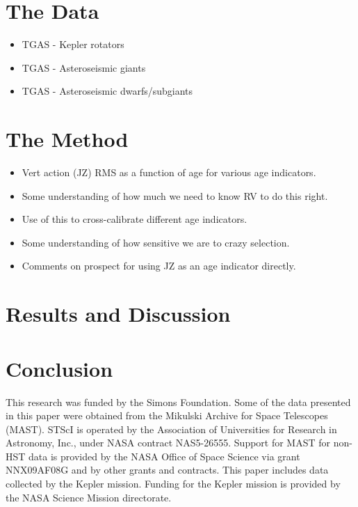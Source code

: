 \documentclass[useAMS, usenatbib, preprint, 12pt]{aastex}
\begin{document}
\section{The Data}

\begin{itemize}
    \item{TGAS - Kepler rotators}
    \item{TGAS - Asteroseismic giants}
    \item{TGAS - Asteroseismic dwarfs/subgiants}
\end{itemize}

\section{The Method}

\begin{itemize}
    \item{Vert action (JZ) RMS as a function of age for various age
        indicators.}
    \item{Some understanding of how much we need to know RV to do this right.}
    \item{Use of this to cross-calibrate different age indicators.}
    \item{Some understanding of how sensitive we are to crazy selection.}
    \item{Comments on prospect for using JZ as an age indicator directly.}
\end{itemize}




\section{Results and Discussion}



\section{Conclusion}


This research was funded by the Simons Foundation.
Some of the data presented in this paper were obtained from the Mikulski
Archive for Space Telescopes (MAST).
STScI is operated by the Association of Universities for Research in
Astronomy, Inc., under NASA contract NAS5-26555.
Support for MAST for non-HST data is provided by the NASA Office of Space
Science via grant NNX09AF08G and by other grants and contracts.
This paper includes data collected by the Kepler mission. Funding for the
Kepler mission is provided by the NASA Science Mission directorate.



\end{document}
